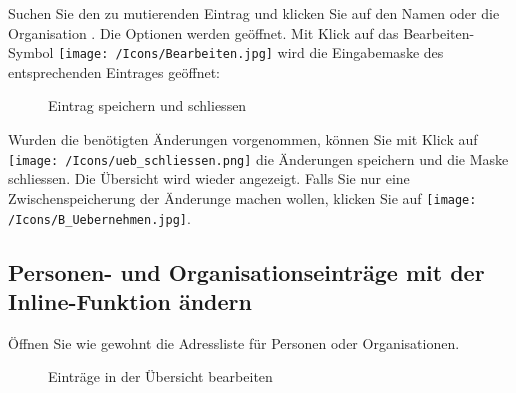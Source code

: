 Suchen Sie den zu mutierenden Eintrag und klicken Sie auf den Namen oder die Organisation . Die Optionen werden geöffnet. Mit Klick auf das Bearbeiten-Symbol \texttt{[image: /Icons/Bearbeiten.jpg]}  wird die Eingabemaske des entsprechenden Eintrages geöffnet:

\begin{figure}[H]
\caption{Eintrag speichern und schliessen}
\end{figure}

Wurden die benötigten Änderungen vorgenommen, können Sie mit Klick auf \texttt{[image: /Icons/ueb\_schliessen.png]}  die Änderungen speichern und die Maske schliessen. Die Übersicht wird wieder angezeigt. Falls Sie nur eine Zwischenspeicherung der Änderunge machen wollen, klicken Sie auf \texttt{[image: /Icons/B\_Uebernehmen.jpg]}.

\pagebreak
\subsection{Personen- und Organisationseinträge mit der Inline-Funktion ändern}
\label{bkm:Ref2018112701}

Öffnen Sie wie gewohnt die Adressliste für Personen oder Organisationen.

\begin{figure}[H]
\caption{Einträge in der Übersicht bearbeiten}
\end{figure}


